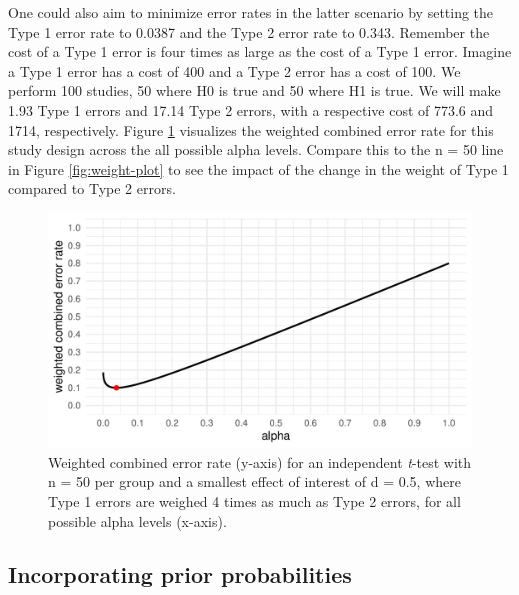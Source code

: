 \documentclass[
  english,
  ,jou, a4paper,floatsintext]{apa6}
\begin{document}
One could also aim to minimize error rates in the latter scenario by setting the Type 1 error rate to 0.0387 and the Type 2 error rate to 0.343. Remember the cost of a Type 1 error is four times as large as the cost of a Type 1 error. Imagine a Type 1 error has a cost of 400 and a Type 2 error has a cost of 100. We perform 100 studies, 50 where H0 is true and 50 where H1 is true. We will make 1.93 Type 1 errors and 17.14 Type 2 errors, with a respective cost of 773.6 and 1714, respectively. Figure \ref{fig:cost-plot} visualizes the weighted combined error rate for this study design across the all possible alpha levels. Compare this to the n = 50 line in Figure \ref{fig:weight-plot} to see the impact of the change in the weight of Type 1 compared to Type 2 errors.

\begin{figure}
\centering
\includegraphics{Justify_in_Practice_files/figure-latex/cost-plot-1.pdf}
\caption{\label{fig:cost-plot}Weighted combined error rate (y-axis) for an independent \emph{t}-test with n = 50 per group and a smallest effect of interest of d = 0.5, where Type 1 errors are weighed 4 times as much as Type 2 errors, for all possible alpha levels (x-axis).}
\end{figure}

\hypertarget{incorporating-prior-probabilities}{%
\subsection{Incorporating prior probabilities}\label{incorporating-prior-probabilities}}
\end{document}
